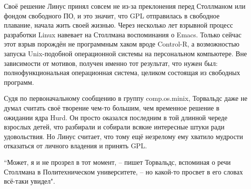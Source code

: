 Своё решение Линус принял совсем не из-за преклонения перед Столлманом или фондом свободного ПО, и это значит, что GPL отправилась в свободное плавание, начала жить своей жизнью. Через несколько лет взрывной процесс разработки Linux навевает на Столлмана воспоминания о Emacs. Только сейчас этот взрыв порождён не программным хаком вроде Control-R, а возможностью запуска Unix-подобной операционной системы на персональном компьютере. Вне зависимости от мотивов, получен именно тот результат, что нужен был: полнофункциональная операционная система, целиком состоящая из свободных программ.

Судя по первоначальному сообщению в группу comp.os.minix, Торвальдс даже не думал считать своё творение чем-то большим, чем временное решение в ожидании ядра Hurd. Он просто оказался последним в той длинной череде взрослых детей, что разбирали и собирали всякие интересные штуки ради удовольствия. Но Линус считает, что тому ещё незрелому ему хватило мудрости отказаться от личного владения и принять GPL.

``Может, я и не прозрел в тот момент, -- пишет Торвальдс, вспоминая о речи Столлмана в Политехническом университете, -- но какой-то просвет в его словах всё-таки увидел".

\theendnotes
\setcounter{endnote}{0}
